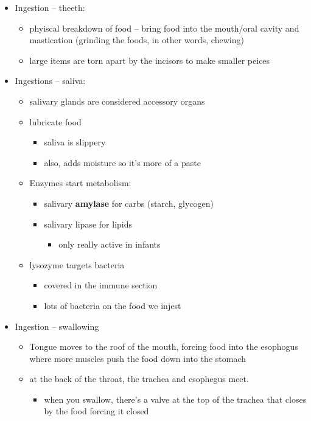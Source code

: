 \documentclass{article}
\theoremstyle{definition}
\begin{document}
\begin{itemize}
\begin{itemize}
		\end{itemize}
	\item Ingestion -- theeth:
		\begin{itemize}
			\item phyiscal breakdown of food -- bring food into the mouth/oral cavity and mastication (grinding the foods, in other words, chewing)
			\item large items are torn apart by the incisors to make smaller peices
		\end{itemize}
	\item Ingestions -- saliva:
		\begin{itemize}
			\item salivary glands are considered accessory organs
			\item lubricate food
				\begin{itemize}
					\item saliva is slippery
					\item also, adds moisture so it's more of a paste
				\end{itemize}
			\item Enzymes  start metabolism:
				\begin{itemize}
					\item salivary \textbf{amylase} for carbs (starch, glycogen)
					\item salivary lipase for lipids 
						\begin{itemize}
							\item only really active in infants
						\end{itemize}
				\end{itemize}
			\item lysozyme targets bacteria
				\begin{itemize}
					\item covered in the immune section
					\item lots of bacteria on the food we injest
				\end{itemize}
		\end{itemize}
	\item Ingestion -- swallowing
		\begin{itemize}
			\item Tongue moves to the roof of the mouth, forcing food into the esophogus where more muscles push the food down into the stomach
			\item at the back of the throat, the trachea and esophegus meet.
				\begin{itemize}
					\item when you swallow, there's a valve at the top of the trachea that closes by the food forcing it closed

\end{itemize}
\end{itemize}
\end{itemize}
\end{document}
